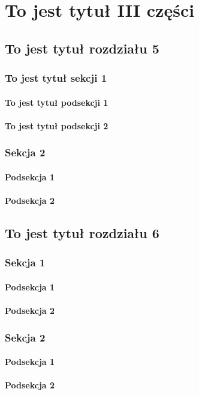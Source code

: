 \documentclass[a4paper, 12pt]{book}
\begin{document}
\part{To jest tytuł III części}
\chapter{To jest tytuł rozdziału 5}
\section{To jest tytuł sekcji 1}
\subsection{To jest tytuł podsekcji 1}
\subsection{To jest tytuł podsekcji 2}
\section{Sekcja 2}
\subsection{Podsekcja 1}
\subsection{Podsekcja 2}
\chapter{To jest tytuł rozdziału 6}
\section{Sekcja 1}
\subsection{Podsekcja 1}
\subsection{Podsekcja 2}
\section{Sekcja 2}
\subsection{Podsekcja 1}
\subsection{Podsekcja 2}
\end{document}

